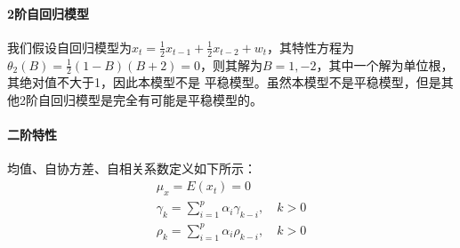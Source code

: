 \paragraph{2阶自回归模型}
我们假设自回归模型为$x_{t}=\frac{1}{2}x_{t-1}+\frac{1}{2}x_{t-2}+w_{t}$，其特性方程为
$\theta _2(B)=\frac{1}{2}(1-B)(B+2)=0$，则其解为$B=1,-2$，其中一个解为单位根，其绝对值不大于1，因此本模型不是
平稳模型。虽然本模型不是平稳模型，但是其他2阶自回归模型是完全有可能是平稳模型的。
\paragraph{二阶特性}
均值、自协方差、自相关系数定义如下所示：
\begin{equation}
\begin{aligned}
\mu _{x}=E(x_{t})=0 \\
\gamma _{k}=\sum_{i=1}^{p}\alpha _{i} \gamma _{k-i}, \quad k>0 \\
\rho _{k} = \sum_{i=1}^{p}\alpha _{i} \rho _{k-i}, \quad k>0
\end{aligned}
\label{e000029}
\end{equation}
